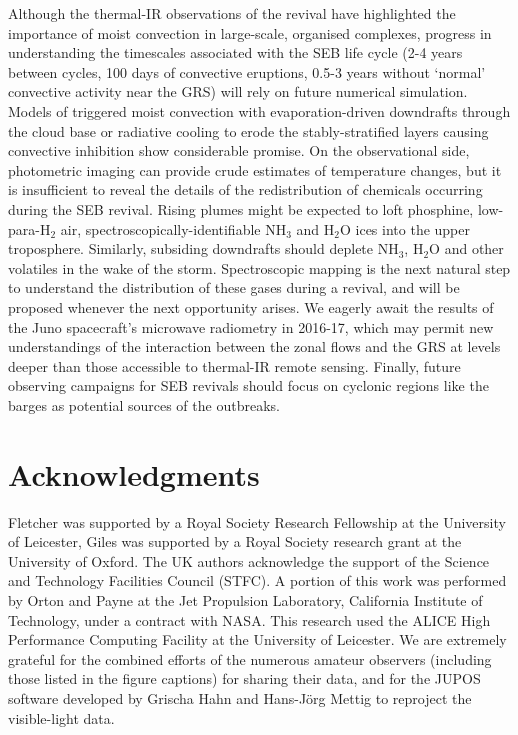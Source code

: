 \documentclass[final,authoryear,5p,times,twocolumn]{elsarticle}
\begin{document}
Although the thermal-IR observations of the revival have highlighted the importance of moist convection in large-scale, organised complexes, progress in understanding the timescales associated with the SEB life cycle (2-4 years between cycles, 100 days of convective eruptions, 0.5-3 years without `normal' convective activity near the GRS) will rely on future numerical simulation.  Models of triggered moist convection with evaporation-driven downdrafts through the cloud base \citep{14sugiyama} or radiative cooling to erode the stably-stratified layers causing convective inhibition \citep{15li} show considerable promise.  On the observational side, photometric imaging can provide crude estimates of temperature changes, but it is insufficient to reveal the details of the redistribution of chemicals occurring during the SEB revival.  Rising plumes might be expected to loft phosphine, low-para-H$_2$ air, spectroscopically-identifiable NH$_3$ and H$_2$O ices into the upper troposphere.  Similarly, subsiding downdrafts should deplete NH$_3$, H$_2$O and other volatiles in the wake of the storm.  Spectroscopic mapping is the next natural step to understand the distribution of these gases during a revival, and will be proposed whenever the next opportunity arises.  We eagerly await the results of the Juno spacecraft's microwave radiometry in 2016-17, which may permit new understandings of the interaction between the zonal flows and the GRS at levels deeper than those accessible to thermal-IR remote sensing.  Finally, future observing campaigns for SEB revivals should focus on cyclonic regions like the barges as potential sources of the outbreaks.



\section*{Acknowledgments}

Fletcher was supported by a Royal Society Research Fellowship at the University of Leicester, Giles was supported by a Royal Society research grant at the University of Oxford.  The UK authors acknowledge the support of the Science and Technology Facilities Council (STFC).  A portion of this work was performed by Orton and Payne at the Jet Propulsion Laboratory, California Institute of Technology, under a contract with NASA.  This research used the ALICE High Performance Computing Facility at the University of Leicester.  We are extremely grateful for the combined efforts of the numerous amateur observers (including those listed in the figure captions) for sharing their data, and for the JUPOS software developed by Grischa Hahn and Hans-J{\"o}rg Mettig to reproject the visible-light data.  
\end{document}
